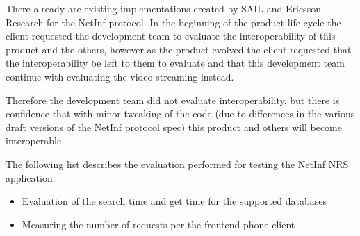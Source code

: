 There already are existing implementations created by SAIL and Ericsson Research for the NetInf protocol. In the beginning of the product life-cycle the client requested the development team to evaluate the interoperability of this product and the others, however as the product evolved the client requested that the interoperability be left to them to evaluate and that this development team continue with evaluating the video streaming instead.

Therefore the development team did not evaluate interoperability, but there is confidence that with minor tweaking of the code (due to differences in the various draft versions of the NetInf protocol spec) this product and others will become interoperable.

The following list describes the evaluation performed for testing the NetInf NRS application.

\begin{itemize}
\item Evaluation of the search time and get time for the supported databases
\item Measuring the number of requests per the frontend phone client
\end{itemize}